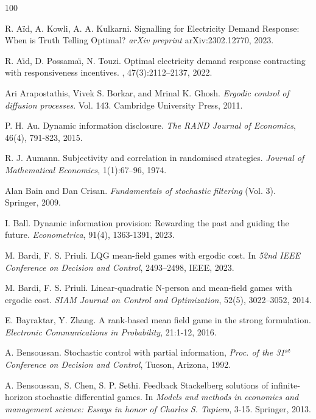 \documentclass[a4paper,10pt]{article}
\theoremstyle{definition}
\theoremstyle{plain}
\numberwithin{equation}{section}
\begin{document}
\begin{thebibliography}{100}

R. Aïd, A. Kowli, A. A. Kulkarni. Signalling for Electricity Demand Response: When is Truth Telling Optimal? {\em arXiv preprint} arXiv:2302.12770, 2023.

R. A{\"\i}d, D. Possama{\"\i}, N. Touzi.
\newblock Optimal electricity demand response contracting with responsiveness
  incentives.
, 47(3):2112--2137, 2022.

Ari Arapostathis, Vivek S. Borkar, and Mrinal K. Ghosh. {\em Ergodic control of diffusion processes}. Vol. 143. Cambridge University Press, 2011.

P. H. Au. Dynamic information disclosure. {\em The RAND Journal of Economics}, 46(4), 791-823, 2015.

R. J. Aumann. Subjectivity and correlation in randomised strategies. {\em Journal of Mathematical Economics}, 1(1):67--96, 1974.

Alan Bain and Dan Crisan. {\em Fundamentals of stochastic filtering} (Vol. 3). Springer, 2009.

I. Ball. Dynamic information provision: Rewarding the past and guiding the future. {\em Econometrica}, 91(4), 1363-1391, 2023.

M. Bardi, F. S. Priuli. LQG mean-field games with ergodic cost. In {\em 52nd IEEE Conference on Decision and Control}, 2493--2498, IEEE, 2023.

M. Bardi, F. S. Priuli. Linear-quadratic N-person and mean-field games with ergodic cost. {\em SIAM Journal on Control and Optimization}, 52(5), 3022--3052, 2014.

E. Bayraktar, Y. Zhang. A rank-based mean field game in the strong formulation. {\em Electronic Communications in Probability}, 21:1-12, 2016.

A. Bensoussan.  Stochastic control with partial information, {\em Proc. of the 31$^{\rm st}$ Conference on Decision and Control}, Tucson, Arizona, 1992.


A. Bensoussan,  S. Chen, S. P.  Sethi. Feedback Stackelberg solutions of infinite-horizon stochastic differential games. In {\em Models and methods in economics and management science: Essays in honor of Charles S. Tapiero}, 3-15. Springer, 2013.


\end{thebibliography}
\end{document}
